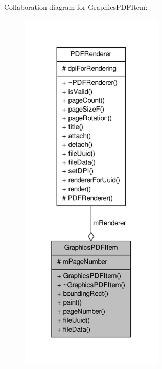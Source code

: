 Collaboration diagram for Graphics\-P\-D\-F\-Item\-:
\nopagebreak
\begin{figure}[H]
\begin{center}
\leavevmode
\includegraphics[width=196pt]{de/ded/class_graphics_p_d_f_item__coll__graph}
\end{center}
\end{figure}
